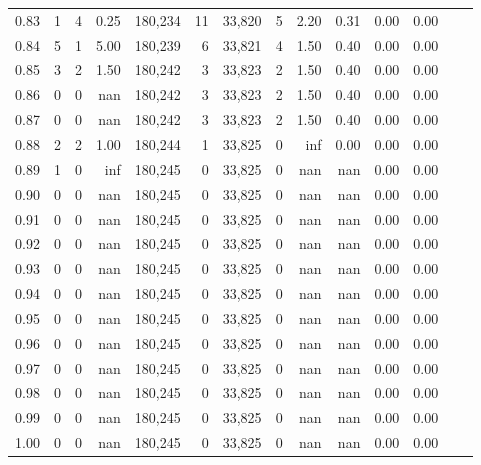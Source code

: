 \begin{tabular}{rrrrrrrrrrrrrr}
0.83 &      1 &      4 &    0.25 &  180,234 &       11 &  33,820 &       5 &  2.20 &  0.31 &  0.00 &      0.00 \\
0.84 &      5 &      1 &    5.00 &  180,239 &        6 &  33,821 &       4 &  1.50 &  0.40 &  0.00 &      0.00 \\
0.85 &      3 &      2 &    1.50 &  180,242 &        3 &  33,823 &       2 &  1.50 &  0.40 &  0.00 &      0.00 \\
0.86 &      0 &      0 &     nan &  180,242 &        3 &  33,823 &       2 &  1.50 &  0.40 &  0.00 &      0.00 \\
0.87 &      0 &      0 &     nan &  180,242 &        3 &  33,823 &       2 &  1.50 &  0.40 &  0.00 &      0.00 \\
0.88 &      2 &      2 &    1.00 &  180,244 &        1 &  33,825 &       0 &   inf &  0.00 &  0.00 &      0.00 \\
0.89 &      1 &      0 &     inf &  180,245 &        0 &  33,825 &       0 &   nan &   nan &  0.00 &      0.00 \\
0.90 &      0 &      0 &     nan &  180,245 &        0 &  33,825 &       0 &   nan &   nan &  0.00 &      0.00 \\
0.91 &      0 &      0 &     nan &  180,245 &        0 &  33,825 &       0 &   nan &   nan &  0.00 &      0.00 \\
0.92 &      0 &      0 &     nan &  180,245 &        0 &  33,825 &       0 &   nan &   nan &  0.00 &      0.00 \\
0.93 &      0 &      0 &     nan &  180,245 &        0 &  33,825 &       0 &   nan &   nan &  0.00 &      0.00 \\
0.94 &      0 &      0 &     nan &  180,245 &        0 &  33,825 &       0 &   nan &   nan &  0.00 &      0.00 \\
0.95 &      0 &      0 &     nan &  180,245 &        0 &  33,825 &       0 &   nan &   nan &  0.00 &      0.00 \\
0.96 &      0 &      0 &     nan &  180,245 &        0 &  33,825 &       0 &   nan &   nan &  0.00 &      0.00 \\
0.97 &      0 &      0 &     nan &  180,245 &        0 &  33,825 &       0 &   nan &   nan &  0.00 &      0.00 \\
0.98 &      0 &      0 &     nan &  180,245 &        0 &  33,825 &       0 &   nan &   nan &  0.00 &      0.00 \\
0.99 &      0 &      0 &     nan &  180,245 &        0 &  33,825 &       0 &   nan &   nan &  0.00 &      0.00 \\
1.00 &      0 &      0 &     nan &  180,245 &        0 &  33,825 &       0 &   nan &   nan &  0.00 &      0.00 \\
\bottomrule
\end{tabular}
